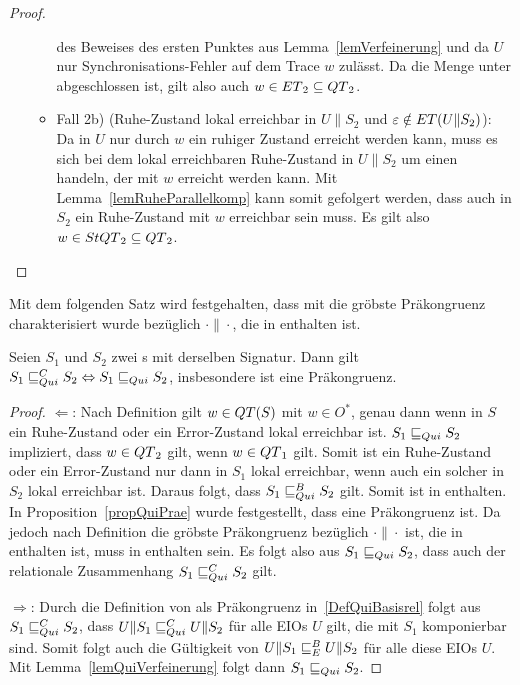 \begin{proof}
\begin{itemize}
\begin{itemize}
          des Beweises des ersten Punktes aus Lemma~\ref{lemVerfeinerung} und
          da $U$ nur Synchronisations-Fehler auf dem Trace $w$ zulässt. Da
          die Menge \ET{} unter \cont{} abgeschlossen ist, gilt also auch $w\in
          ET{}_2\subseteq QT{}_2$.
        \item Fall 2b) (Ruhe-Zustand lokal erreichbar in $U\|S_2$ und
          $\varepsilon\notin ET{}(U\|S_2)$): Da in $U$
          nur durch $w$ ein ruhiger Zustand erreicht werden kann, muss es sich
          bei dem lokal erreichbaren Ruhe-Zustand in $U\|S_2$ um einen handeln,
          der mit $w$ erreicht werden kann. Mit Lemma~\ref{lemRuheParallelkomp}
          kann somit gefolgert werden, dass auch in $S_2$ ein Ruhe-Zustand mit
          $w$ erreichbar sein muss. Es gilt also $w\in StQT{}_2\subseteq
          QT{}_2$.
      \end{itemize}
  \end{itemize}
\end{proof}

Mit dem folgenden Satz wird festgehalten, dass mit \QRel{} die gröbste
Präkongruenz charakterisiert wurde bezüglich $\cdot\|\cdot$, die in \QBRel{}
enthalten ist.

\begin{satz}
\label{satzQuiFullAbst}
  Seien $S_1$ und $S_2$ zwei \EIO{}s mit derselben Signatur. Dann gilt
  $S_1\sqsubseteq _{Qui}^C S_2\Leftrightarrow S_1\sqsubseteq _{Qui} S_2$, insbesondere ist \QRel{} eine
  Präkongruenz.
\end{satz}

\begin{proof}
  \glqq{}$\Leftarrow$\grqq{}: Nach Definition gilt $w\in QT{}(S)$ mit $w\in
  O^*$, genau dann wenn in $S$ ein Ruhe-Zustand oder ein Error-Zustand lokal
  erreichbar ist. $S_1\sqsubseteq _{Qui} S_2$ impliziert, dass $w\in QT{}_2$ gilt, wenn
  $w\in QT{}_1$ gilt. Somit ist ein Ruhe-Zustand oder ein Error-Zustand nur dann in
  $S_1$ lokal erreichbar, wenn auch ein solcher in $S_2$ lokal erreichbar ist.
  Daraus folgt, dass $S_1\sqsubseteq _{Qui}^B S_2$ gilt. Somit ist \QRel{} in \QBRel{}
  enthalten. In Proposition~\ref{propQuiPrae} wurde festgestellt, dass \QRel{}
  eine Präkongruenz ist. Da jedoch \QCRel{} nach Definition die gröbste
  Präkongruenz bezüglich $\cdot\|\cdot$ ist, die in \QBRel{} enthalten ist,
  muss \QRel{} in \QCRel{} enthalten sein. Es folgt also aus $S_1\sqsubseteq _{Qui} S_2$,
  dass auch der relationale Zusammenhang $S_1\sqsubseteq _{Qui}^C S_2$ gilt.

  \glqq{}$\Rightarrow$\grqq{}: Durch die Definition von \QCRel{} als
  Präkongruenz in~\ref{DefQuiBasisrel} folgt aus $S_1\sqsubseteq _{Qui}^C{} S_2$, dass
  $U\|S_1\sqsubseteq _{Qui}^C U\|S_2$ für alle EIOs $U$ gilt, die mit $S_1$ komponierbar sind.
  Somit folgt auch die Gültigkeit von $U\|S_1\sqsubseteq _E^B U\|S_2$ für alle diese EIOs
  $U$. Mit Lemma~\ref{lemQuiVerfeinerung} folgt dann $S_1\sqsubseteq _{Qui}{} S_2$.
\end{proof}

